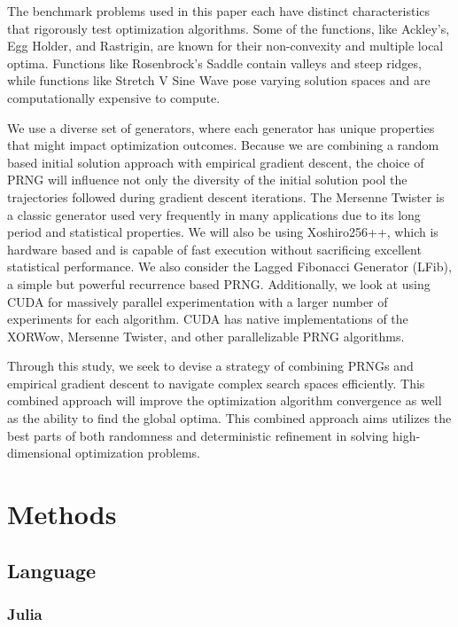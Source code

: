 \documentclass{article}
\begin{document}
        The benchmark problems used in this paper each have distinct characteristics that rigorously test optimization algorithms. Some of the functions, like Ackley’s, Egg Holder, and Rastrigin, are known for their non-convexity and multiple local optima. Functions like Rosenbrock’s Saddle contain valleys and steep ridges, while functions like Stretch V Sine Wave pose varying solution spaces and are computationally expensive to compute.

        We use a diverse set of generators, where each generator has unique properties that might impact optimization outcomes. Because we are combining a random based initial solution approach with empirical gradient descent, the choice of PRNG will influence not only the diversity of the initial solution pool the trajectories followed during gradient descent iterations. The Mersenne Twister is a classic generator used very frequently in many applications due to its long period and statistical properties. We will also be using Xoshiro256++, which is hardware based and is capable of fast execution without sacrificing excellent statistical performance. We also consider the Lagged Fibonacci Generator (LFib), a simple but powerful recurrence based PRNG. Additionally, we look at using CUDA for massively parallel experimentation with a larger number of experiments for each algorithm. CUDA has native implementations of the XORWow, Mersenne Twister, and other parallelizable PRNG algorithms.

        Through this study, we seek to devise a strategy of combining PRNGs and empirical gradient descent to navigate complex search spaces efficiently. This combined approach will improve the optimization algorithm convergence as well as the ability to find the global optima. This combined approach aims utilizes the best parts of both randomness and deterministic refinement in solving high-dimensional optimization problems.

    \section{Methods}

        \subsection{Language}

            \subsubsection{Julia}
\end{document}
